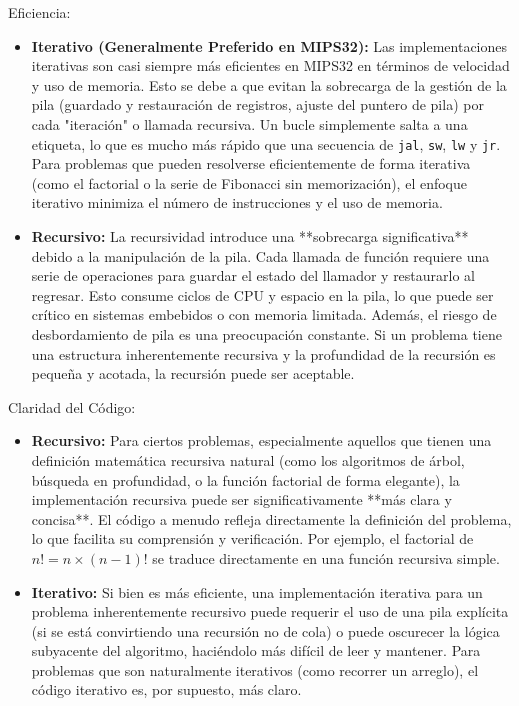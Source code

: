 \documentclass{article}
\begin{document}
 Eficiencia:
\begin{itemize}
    \item \textbf{Iterativo (Generalmente Preferido en MIPS32):} Las implementaciones iterativas son casi siempre más eficientes en MIPS32 en términos de velocidad y uso de memoria. Esto se debe a que evitan la sobrecarga de la gestión de la pila (guardado y restauración de registros, ajuste del puntero de pila) por cada "iteración" o llamada recursiva. Un bucle simplemente salta a una etiqueta, lo que es mucho más rápido que una secuencia de \texttt{jal}, \texttt{sw}, \texttt{lw} y \texttt{jr}. Para problemas que pueden resolverse eficientemente de forma iterativa (como el factorial o la serie de Fibonacci sin memorización), el enfoque iterativo minimiza el número de instrucciones y el uso de memoria.
    \item \textbf{Recursivo:} La recursividad introduce una **sobrecarga significativa** debido a la manipulación de la pila. Cada llamada de función requiere una serie de operaciones para guardar el estado del llamador y restaurarlo al regresar. Esto consume ciclos de CPU y espacio en la pila, lo que puede ser crítico en sistemas embebidos o con memoria limitada. Además, el riesgo de desbordamiento de pila es una preocupación constante. Si un problema tiene una estructura inherentemente recursiva y la profundidad de la recursión es pequeña y acotada, la recursión puede ser aceptable.
\end{itemize}

 Claridad del Código:
\begin{itemize}
    \item \textbf{Recursivo:} Para ciertos problemas, especialmente aquellos que tienen una definición matemática recursiva natural (como los algoritmos de árbol, búsqueda en profundidad, o la función factorial de forma elegante), la implementación recursiva puede ser significativamente **más clara y concisa**. El código a menudo refleja directamente la definición del problema, lo que facilita su comprensión y verificación. Por ejemplo, el factorial de $n! = n \times (n-1)!$ se traduce directamente en una función recursiva simple.
    \item \textbf{Iterativo:} Si bien es más eficiente, una implementación iterativa para un problema inherentemente recursivo puede requerir el uso de una pila explícita (si se está convirtiendo una recursión no de cola) o puede oscurecer la lógica subyacente del algoritmo, haciéndolo más difícil de leer y mantener. Para problemas que son naturalmente iterativos (como recorrer un arreglo), el código iterativo es, por supuesto, más claro.
\end{itemize}
\end{document}
